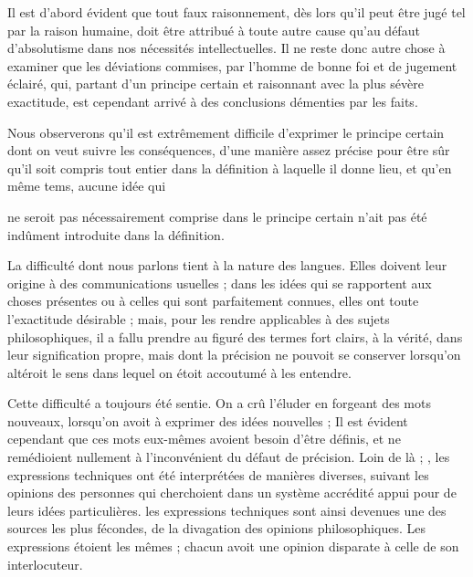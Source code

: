 \documentclass[11pt,a4paper]{article}
\begin{document}
Il est d'abord évident que tout faux raisonnement, dès lors qu'il peut
être jugé tel par la raison humaine, doit être attribué à toute autre
cause qu'au défaut d'absolutisme dans nos nécessités intellectuelles. Il
ne reste donc autre chose à examiner que les déviations commises, par
l'homme de bonne foi et de jugement éclairé, qui, partant d'un principe
certain et raisonnant avec la plus  sévère exactitude, est
cependant arrivé à des conclusions démenties par les faits.

Nous observerons qu'il est extrêmement difficile d'exprimer le principe
certain dont on veut suivre les conséquences, d'une manière assez
précise pour être sûr qu'il soit compris tout entier dans la définition
à laquelle il donne lieu, et qu'en même tems, aucune idée qui

ne seroit pas nécessairement comprise dans le principe certain n'ait pas
été indûment introduite dans la définition.

La difficulté  dont nous parlons tient à la
nature des langues. Elles doivent leur origine à des communications
usuelles ; dans les idées qui se rapportent aux choses présentes ou à
celles qui sont parfaitement connues, elles ont toute l'exactitude
désirable ; mais, pour les  rendre
applicables à des sujets philosophiques, il a fallu prendre au figuré
des termes fort clairs, à la vérité, dans leur signification propre,
mais dont la précision ne pouvoit se conserver lorsqu'on altéroit le
sens dans lequel on étoit accoutumé à les entendre.

Cette difficulté a toujours été sentie. On a crû l'éluder en forgeant
des mots nouveaux, lorsqu'on avoit à exprimer des idées nouvelles ; Il
est évident cependant que ces mots eux-mêmes  avoient
besoin d'être définis, et ne remédioient nullement à l'inconvénient du
défaut de précision. Loin de là ; , les expressions
techniques ont été interprétées de manières diverses, suivant les
opinions des  personnes qui cherchoient dans un système
accrédité  appui  pour de
leurs idées particulières.  les expressions
techniques sont ainsi devenues une des sources les plus fécondes, de la
divagation des opinions philosophiques. \struck{\ill{}} Les
 expressions étoient les mêmes ;  chacun avoit
une opinion disparate à celle de son interlocuteur.
\end{document}
